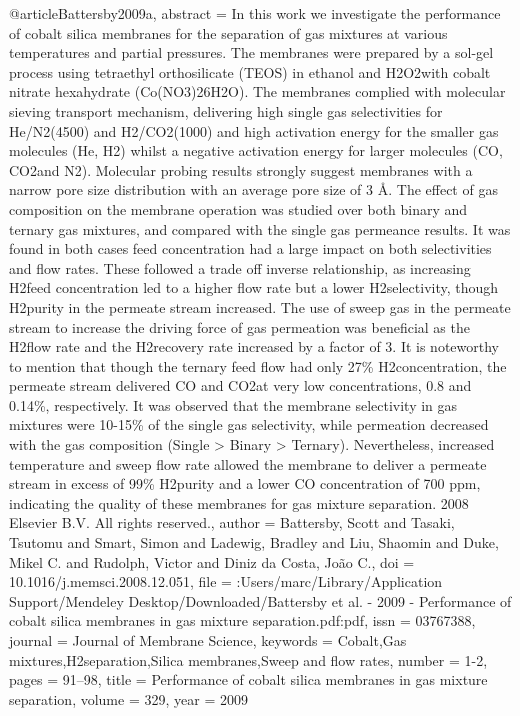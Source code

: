 @article{Battersby2009a,
abstract = {In this work we investigate the performance of cobalt silica membranes for the separation of gas mixtures at various temperatures and partial pressures. The membranes were prepared by a sol-gel process using tetraethyl orthosilicate (TEOS) in ethanol and H2O2with cobalt nitrate hexahydrate (Co(NO3)26H2O). The membranes complied with molecular sieving transport mechanism, delivering high single gas selectivities for He/N2(4500) and H2/CO2(1000) and high activation energy for the smaller gas molecules (He, H2) whilst a negative activation energy for larger molecules (CO, CO2and N2). Molecular probing results strongly suggest membranes with a narrow pore size distribution with an average pore size of 3 {\AA}. The effect of gas composition on the membrane operation was studied over both binary and ternary gas mixtures, and compared with the single gas permeance results. It was found in both cases feed concentration had a large impact on both selectivities and flow rates. These followed a trade off inverse relationship, as increasing H2feed concentration led to a higher flow rate but a lower H2selectivity, though H2purity in the permeate stream increased. The use of sweep gas in the permeate stream to increase the driving force of gas permeation was beneficial as the H2flow rate and the H2recovery rate increased by a factor of 3. It is noteworthy to mention that though the ternary feed flow had only 27{\%} H2concentration, the permeate stream delivered CO and CO2at very low concentrations, 0.8 and 0.14{\%}, respectively. It was observed that the membrane selectivity in gas mixtures were 10-15{\%} of the single gas selectivity, while permeation decreased with the gas composition (Single {\textgreater} Binary {\textgreater} Ternary). Nevertheless, increased temperature and sweep flow rate allowed the membrane to deliver a permeate stream in excess of 99{\%} H2purity and a lower CO concentration of 700 ppm, indicating the quality of these membranes for gas mixture separation. {\textcopyright} 2008 Elsevier B.V. All rights reserved.},
author = {Battersby, Scott and Tasaki, Tsutomu and Smart, Simon and Ladewig, Bradley and Liu, Shaomin and Duke, Mikel C. and Rudolph, Victor and {Diniz da Costa}, Jo{\~{a}}o C.},
doi = {10.1016/j.memsci.2008.12.051},
file = {:Users/marc/Library/Application Support/Mendeley Desktop/Downloaded/Battersby et al. - 2009 - Performance of cobalt silica membranes in gas mixture separation.pdf:pdf},
issn = {03767388},
journal = {Journal of Membrane Science},
keywords = {Cobalt,Gas mixtures,H2separation,Silica membranes,Sweep and flow rates},
number = {1-2},
pages = {91--98},
title = {{Performance of cobalt silica membranes in gas mixture separation}},
volume = {329},
year = {2009}
}
